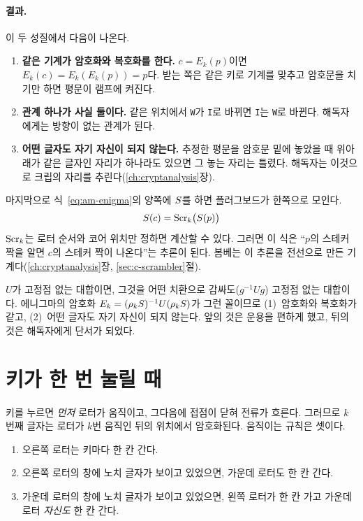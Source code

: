 \paragraph{결과.} 이 두 성질에서 다음이 나온다.
\begin{enumerate}
\item \textbf{같은 기계가 암호화와 복호화를 한다.} $c = E_k(p)$이면 $E_k(c) = E_k(E_k(p)) = p$다. 받는 쪽은 같은
키로 기계를 맞추고 암호문을 치기만 하면 평문이 램프에 켜진다.
\item \textbf{관계 하나가 사실 둘이다.} 같은 위치에서 \texttt{W}가 \texttt{I}로 바뀌면 \texttt{I}는 \texttt{W}로
바뀐다. 해독자에게는 방향이 없는 관계가 된다.
\item \textbf{어떤 글자도 자기 자신이 되지 않는다.} 추정한 평문을 암호문 밑에 놓았을 때 위아래가 같은 글자인 자리가
하나라도 있으면 그 놓는 자리는 틀렸다. 해독자는 이것으로 크립의 자리를 추린다(\ref{ch:cryptanalysis}장).
\end{enumerate}

마지막으로 식~\eqref{eq:am-enigma}의 양쪽에 $S$를 하면 플러그보드가 한쪽으로 모인다.
\begin{equation}
  S(c) = \mathrm{Scr}_k\bigl(S(p)\bigr) \label{eq:am-moved}
\end{equation}
$\mathrm{Scr}_k$는 로터 순서와 코어 위치만 정하면 계산할 수 있다. 그러면 이 식은 ``$p$의 스테커 짝을 알면 $c$의 스테커 짝이
나온다''는 추론이 된다. 봄베는 이 추론을 전선으로 만든 기계다(\ref{ch:cryptanalysis}장, \ref{sec:c-scrambler}절).

\begin{keybox}[title={이 절의 요점}]
$U$가 고정점 없는 대합이면, 그것을 어떤 치환으로 감싸도($g^{-1}Ug$) 고정점 없는 대합이다. 에니그마의 암호화
$E_k = (\rho_kS)^{-1}U(\rho_kS)$가 그런 꼴이므로 (1)~암호화와 복호화가 같고, (2)~어떤 글자도 자기 자신이
되지 않는다. 앞의 것은 운용을 편하게 했고, 뒤의 것은 해독자에게 단서가 되었다.
\end{keybox}

\section{키가 한 번 눌릴 때}\label{sec:am-stepping}

키를 누르면 \emph{먼저} 로터가 움직이고, 그다음에 접점이 닫혀 전류가 흐른다. 그러므로 $k$번째 글자는 로터가 $k$번
움직인 뒤의 위치에서 암호화된다. 움직이는 규칙은 셋이다.

\begin{enumerate}
\item 오른쪽 로터는 키마다 한 칸 간다.
\item 오른쪽 로터의 창에 노치 글자가 보이고 있었으면, 가운데 로터도 한 칸 간다.
\item 가운데 로터의 창에 노치 글자가 보이고 있었으면, 왼쪽 로터가 한 칸 가고 가운데 로터 \emph{자신도} 한 칸 간다.
\end{enumerate}

